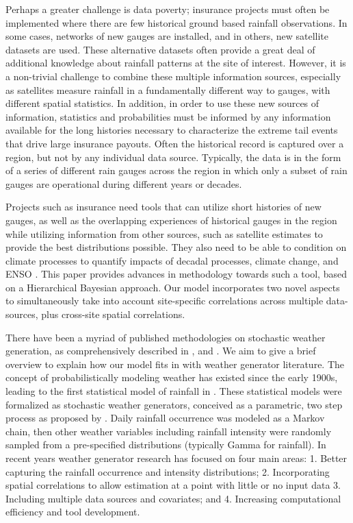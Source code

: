 \documentclass[12pt]{article}
\begin{document}
Perhaps a greater challenge is data poverty;  insurance projects must often be implemented where there are few historical ground based rainfall observations.  In some cases, networks of new gauges are installed, and in others, new satellite datasets are used.  These alternative datasets often provide a great deal of additional knowledge about rainfall patterns at the site of interest.  However, it is a non-trivial challenge to combine these multiple information sources, especially as satellites measure rainfall in a fundamentally different way to gauges, with different spatial statistics.  In addition, in order to use these new sources of information, statistics and probabilities must be informed by any information available for the long histories necessary to characterize the extreme tail events that drive large insurance payouts. Often the historical record is captured over a region, but not by any individual data source.  Typically, the data is in the form of a series of different rain gauges across the region in which only a subset of rain gauges are operational during different years or decades.

Projects such as insurance need tools that can utilize short histories of new gauges, as well as the overlapping experiences of historical gauges in the region while utilizing information from other sources, such as satellite estimates to provide the best distributions possible.  They also need to be able to condition on climate processes to quantify impacts of decadal processes, climate change, and ENSO \citep{Bell2013}.   This paper provides advances in methodology towards such a tool, based on a Hierarchical Bayesian approach.  Our model incorporates two novel aspects to simultaneously take into account site-specific correlations across multiple data-sources, plus cross-site spatial correlations.

There have been a myriad of published methodologies on stochastic weather generation, as comprehensively described in \citet{Wilks1999}, \citep{Sanso2000} and \citet{Verdin2015}.   We aim to give a brief overview to explain how our model fits in with weather generator literature.  The concept of probabilistically modeling weather has existed since the early 1900s, leading to the first statistical model of rainfall in \citet{Gabriel1962}.  These statistical models were formalized as stochastic weather generators, conceived as a parametric, two step process as proposed by \citet{Richardson1981}.  Daily rainfall occurrence was modeled as a Markov chain, then other weather variables including rainfall intensity were randomly sampled from a pre-specified distributions (typically Gamma for rainfall).   In recent years weather generator research has focused on four main areas: 1. Better capturing the rainfall occurrence and intensity distributions; 2. Incorporating spatial correlations to allow estimation at a point with little or no input data 3. Including multiple data sources and covariates; and 4. Increasing computational efficiency and tool development.  
\end{document}
